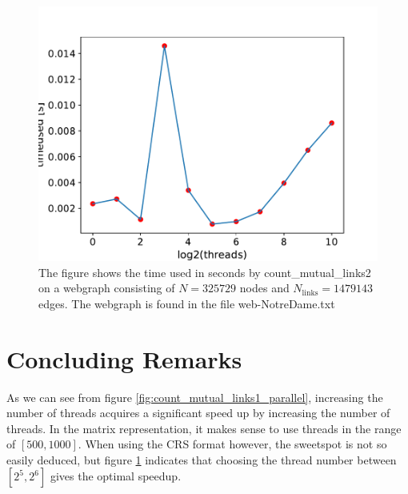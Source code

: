 \documentclass[english,notitlepage, reprint]{revtex4-1}  %
\begin{document}
\begin{figure}[H]
    \centering
    \includegraphics[scale = 0.5]{count_mutual_links2_parallel.pdf}
    \caption{The figure shows the time used  in seconds by count\_mutual\_links2 on a webgraph consisting of $N = 325729$ nodes and $N_\text{links} = 1479143$ edges. The webgraph is found in the file web-NotreDame.txt}\label{fig:count_mutual_links2_parallel}
\end{figure}

\section{Concluding Remarks}
As we can see from figure \ref{fig:count_mutual_links1_parallel}, increasing the number of threads acquires a significant speed up by increasing the number of threads. In the matrix representation, it makes sense to use threads in the range of $[500, 1000]$. When using the CRS format however, the sweetspot is not so easily deduced, but figure \ref{fig:count_mutual_links2_parallel} indicates that choosing the thread number between $[2^5, 2^6]$ gives the optimal speedup.
\end{document}
